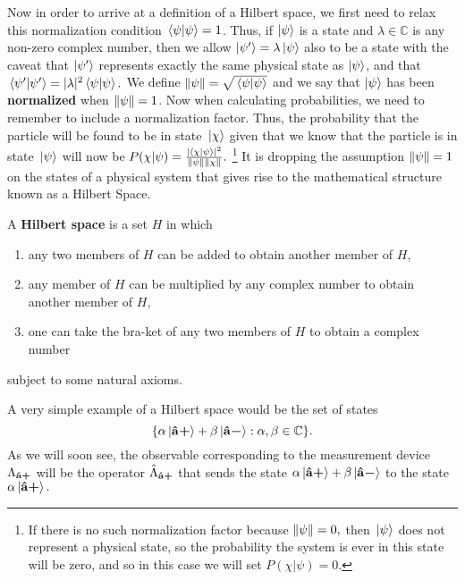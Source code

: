 \documentclass[letter, 12pt]{turabian-thesis}
\theoremstyle{hypothesis}
\newcommand{\uvb}[1]{\vb{\hat{{#1}}}}
\newcommand{\uvbp}[1]{\uvb{#1}\bm{+}}
\newcommand{\uvbm}[1]{\uvb{#1}\bm{-}}
\let\origfootnote\footnote %
\renewcommand{\footnote}[1]{%
\noindent %
\origfootnote{#1}}
\begin{document}
Now in order to arrive at a definition of a Hilbert space, we first need to relax this normalization condition $\ip*{\psi}{\psi}=1$. Thus, if $\ket{\psi}$  is a state and $\lambda\in\mathbb{C}$ is any non-zero complex number, then we allow $\ket{\psi'}=\lambda\ket{\psi}$ also to be a state with the caveat that $\ket{\psi'}$ represents exactly the same physical state as $\ket{\psi}$, and that $\ip*{\psi'}{\psi'}=|\lambda|^2\ip*{\psi}{\psi}.$ We define $\norm{\psi}=\sqrt{\ip*{\psi}{\psi}}$ and we say that $\ket{\psi}$ has been \textbf{normalized} when $\norm{\psi}=1$. Now when calculating probabilities, we need to remember to include a normalization factor. Thus, the probability that the particle will be found to be in state $\ket*{\chi}$ given that we know that the particle is in state $\ket*{\psi}$ will now be $P(\chi|\psi) = \frac{|\ip*{\chi}{\psi}|^2}{\norm{\psi}\norm{\chi}}.$\footnote{ If there is no such normalization factor because $\norm{\psi}=0,$ then $\ket*{\psi}$ does not represent a physical state, so the probability the system is ever in this state will be zero, and so in this case we will set $P(\chi|\psi)=0.$} It is  dropping the assumption $\norm{\psi}=1$ on the states of a physical system that gives rise to the mathematical structure known as a Hilbert Space.   

A \textbf{Hilbert space} is a set $H$ in which 
\begin{enumerate}[noitemsep, nosep, topsep=0pt]
\item any two members of $H$ can be added to obtain another member of $H$, 
\item any member of $H$ can be multiplied by any complex number to obtain another member of $H$,
\item one can take the bra-ket of any two members of $H$ to obtain a complex number\end{enumerate}
subject to some natural axioms.\footnotemark

A very simple example of a Hilbert space would be the set of states 
$$\{\alpha\ket*{\uvbp{a}}+\beta\ket*{\uvbm{a}}:\alpha,\beta\in\mathbb{C}\}.$$ 
As we will soon see, the observable corresponding to the measurement device $\Lambda_{\uvbp{a}}$ will be the operator $\hat{\Lambda}_{\uvbp{a}}$ that sends the state $\alpha\ket*{\uvbp{a}}+\beta\ket*{\uvbm{a}}$ to the state $\alpha\ket*{\uvbp{a}}.$
\end{document}
